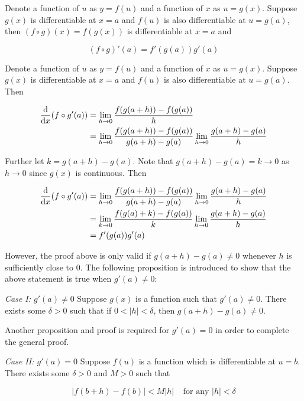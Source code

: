 \documentclass[a4paper,12pt]{article}
\begin{document}
\begin{thm}
  Denote a function of $u$ as $y=f(u)$ and a function of $x$ as $u=g(x)$. Suppose $g(x)$ is differentiable at $x=a$ and $f(u)$ is also differentiable at $u=g(a)$, then $(f\circ g)(x)=f(g(x))$ is differentiable at $x=a$ and

  $$(f\circ g)'(a)=f'(g(a))g'(a)$$\s

  \prf Denote a function of $u$ as $y=f(u)$ and a function of $x$ as $u=g(x)$. Suppose $g(x)$ is differentiable at $x=a$ and $f(u)$ is also differentiable at $u=g(a)$. Then

  $$\begin{aligned}[t]
    \frac{\mathrm{d} }{\mathrm{d}  x}(f\circ g'(a))&=\lim_{h\to 0}\frac{f(g(a+h))-f(g(a))}{h}\\
    &=\lim_{h\to 0}\frac{f(g(a+h))-f(g(a))}{g(a+h)-g(a)}\lim_{h\to 0}\frac{g(a+h)-g(a)}{h}
  \end{aligned}$$\s

  Further let $k=g(a+h)-g(a)$. Note that $g(a+h)-g(a)=k\to 0$ as $h\to 0$ since $g(x)$ is continuous. Then

  $$\begin{aligned}[t]
    \frac{\mathrm{d} }{\mathrm{d}  x}(f\circ g'(a))&=\lim_{h\to 0}\frac{f(g(a+h))-f(g(a))}{g(a+h)-g(a)}\lim_{h\to 0}\frac{g(a+h)-g(a)}{h}\\
    &=\lim_{k\to 0}\frac{f(g(a)+k)-f(g(a))}{k}\lim_{h\to 0}\frac{g(a+h)-g(a)}{h}\\
    &=f'(g(a))g'(a)
  \end{aligned}$$
\end{thm}

However, the proof above is only valid if $g(a+h)-g(a)\neq 0$ whenever $h$ is sufficiently close to $0$. The following proposition is introduced to show that the above statement is true when $g'(a)\neq 0$:\n

\begin{pst}
  {\color{zt}\textit{Case I: $g'(a)\neq 0$}} Suppose $g(x)$ is a function such that $g'(a)\neq 0$. There exists some $\delta>0$ such that if $0<\left| h\right| <\delta$, then $g(a+h)-g(a)\neq 0$.
\end{pst}\n

Another proposition and proof is required for $g'(a)=0$ in order to complete the general proof.\n

\begin{pst}
  {\color{zt}\textit{Case II: $g'(a)=0$}} Suppose $f(u)$ is a function which is differentiable at $u=b$. There exists some $\delta>0$ and $M>0$ such that

  $$\left| f(b+h)-f(b)\right| <M\left| h\right| \;\;\;\;\text{for any }\left| h\right| <\delta$$
\end{pst}\n
\end{document}
